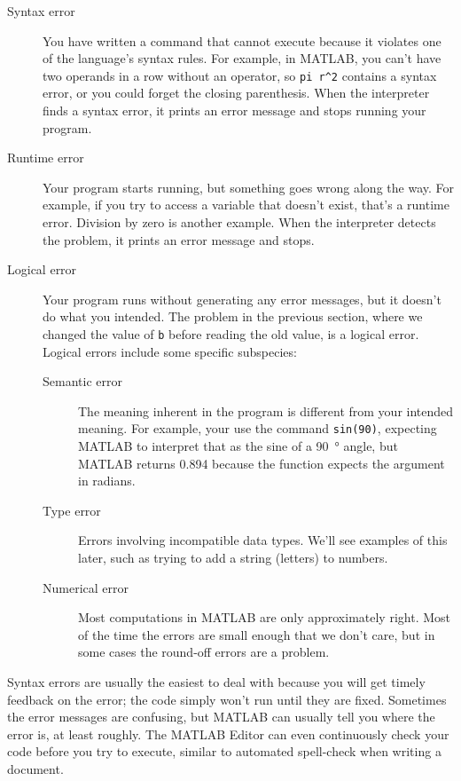 \documentclass[../../book.tex]{subfiles}
\begin{document}
\begin{description}

\item[Syntax error] You have written a command that cannot execute because it violates one of the language's syntax rules.  For example, in MATLAB, you can't have two operands in a row without an operator, so \lstinline{pi r^2} contains a syntax error, or you could forget the closing parenthesis.  When the interpreter finds a syntax error, it prints an error message and stops running your program.

\item[Runtime error] Your program starts running, but something goes wrong along the way.  For example, if you try to access a variable that doesn't exist, that's a runtime error.  Division by zero is another example.  When the interpreter detects the problem, it prints an error message and stops.

\item[Logical error] Your program runs without generating any error messages, but it doesn't do what you intended.  The problem in the previous section, where we changed the value of \lstinline{b} before reading the old value, is a logical error.  Logical errors include some specific subspecies:
\begin{description}
    \item [Semantic error] The meaning inherent in the program is different from your intended meaning.  For example, your use the command \lstinline{sin(90)}, expecting MATLAB to interpret that as the sine of a \SI{90}{\degree} angle, but MATLAB returns 0.894 because the function expects the argument in radians.
    \item [Type error] Errors involving incompatible data types.  We'll see examples of this later, such as trying to add a string (letters) to numbers.
    \item[Numerical error] Most computations in MATLAB are only approximately right.  Most of the time the errors are small enough that we don't care, but in some cases the round-off errors are a problem.
\end{description}
\end{description}

Syntax errors are usually the easiest to deal with because you will get timely feedback on the error; the code simply won't run until they are fixed.  Sometimes the error messages are confusing, but MATLAB can usually tell you where the error is, at least roughly.  The MATLAB Editor can even continuously check your code before you try to execute, similar to automated spell-check when writing a document.
\end{document}
